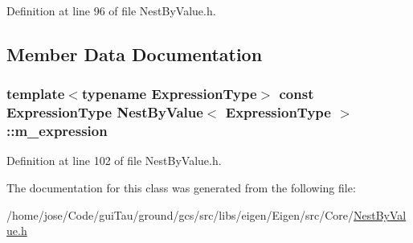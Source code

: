 Definition at line 96 of file Nest\-By\-Value.\-h.



\subsection{Member Data Documentation}
\hypertarget{class_nest_by_value_abededd28edf27665ef9e83b26d602a88}{
\subsubsection[{m\-\_\-expression}]{\setlength{\rightskip}{0pt plus 5cm}template$<$typename Expression\-Type$>$ const Expression\-Type {\bf Nest\-By\-Value}$<$ Expression\-Type $>$\-::m\-\_\-expression\hspace{0.3cm}{\ttfamily [protected]}}}\label{class_nest_by_value_abededd28edf27665ef9e83b26d602a88}


Definition at line 102 of file Nest\-By\-Value.\-h.



The documentation for this class was generated from the following file\-:\begin{DoxyCompactItemize}
\item 
/home/jose/\-Code/gui\-Tau/ground/gcs/src/libs/eigen/\-Eigen/src/\-Core/\hyperlink{_nest_by_value_8h}{Nest\-By\-Value.\-h}\end{DoxyCompactItemize}
